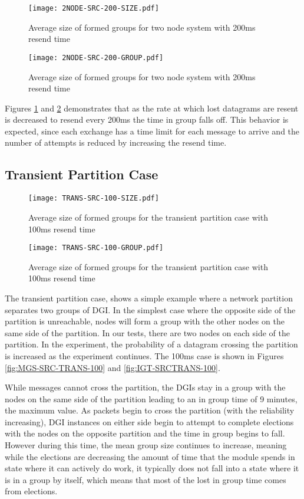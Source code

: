 \begin{figure}[!h]
\centering
\texttt{[image: 2NODE-SRC-200-SIZE.pdf]}
\caption{Average size of formed groups for two node system with 200ms resend time}
\label{fig:MGS-SRC-2NODE-200}
\end{figure}

\begin{figure}[!h]
\centering
\texttt{[image: 2NODE-SRC-200-GROUP.pdf]}
\caption{Average size of formed groups for two node system with 200ms resend time}
\label{fig:IGT-SRC-2NODE-200}
\end{figure}

Figures \ref{fig:MGS-SRC-2NODE-200} and \ref{fig:IGT-SRC-2NODE-200} demonstrates that as the
rate at which lost datagrams are resent is decreased to resend every 200ms the
time in group falls off. This behavior is expected, since each exchange has a
time limit for each message to arrive and the number of attempts is reduced by
increasing the resend time.

\subsection{Transient Partition Case}

\begin{figure}[!h]
\centering
\texttt{[image: TRANS-SRC-100-SIZE.pdf]}
\caption{Average size of formed groups for the transient partition case with 100ms resend time}
\label{fig:MGS-TRANS-100}
\end{figure}

\begin{figure}[!h]
\centering
\texttt{[image: TRANS-SRC-100-GROUP.pdf]}
\caption{Average size of formed groups for the transient partition case with 100ms resend time}
\label{fig:IGT-TRANS-100}
\end{figure}

The transient partition case, shows a simple example where a network partition
separates two groups of DGI. In the simplest case where the opposite side of
the partition is unreachable, nodes will form a group with the other nodes on the
same side of the partition. In our tests, there are two nodes on each side of
the partition. In the experiment, the probability of a datagram crossing the
partition is increased as the experiment continues. The 100ms case is shown in
Figures \ref{fig:MGS-SRC-TRANS-100} and \ref{fig:IGT-SRCTRANS-100}.

While messages cannot cross the partition, the DGIs stay in a group with the
nodes on the same side of the partition leading to an in group time of 9 minutes,
the maximum value. As packets begin to cross the partition (with the reliability
increasing), DGI instances on either side begin to attempt to complete elections
with the nodes on the opposite partition and the time in group begins to fall.
However during this time, the mean group size continues to increase, meaning
while the elections are decreasing the amount of time that the module spends in
state where it can actively do work, it typically does not fall into a state
where it is in a group by itself, which means that most of the lost in group
time comes from elections.

